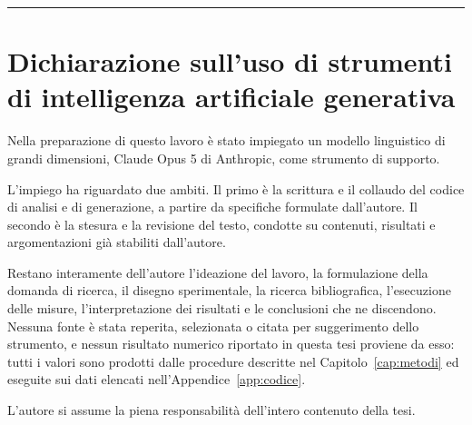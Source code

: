 %

\bigskip
\noindent\rule{\textwidth}{0.4pt}

\section*{Dichiarazione sull'uso di strumenti di intelligenza artificiale
generativa}

Nella preparazione di questo lavoro è stato impiegato un modello linguistico di
grandi dimensioni, Claude Opus 5 di Anthropic, come strumento di supporto.

L'impiego ha riguardato due ambiti. Il primo è la scrittura e il collaudo del
codice di analisi e di generazione, a partire da specifiche formulate
dall'autore. Il secondo è la stesura e la revisione del testo, condotte su
contenuti, risultati e argomentazioni già stabiliti dall'autore.

Restano interamente dell'autore l'ideazione del lavoro, la formulazione della
domanda di ricerca, il disegno sperimentale, la ricerca bibliografica,
l'esecuzione delle misure, l'interpretazione dei risultati e le conclusioni che
ne discendono. Nessuna fonte è stata reperita, selezionata o citata per
suggerimento dello strumento, e nessun risultato numerico riportato in questa
tesi proviene da esso: tutti i valori sono prodotti dalle procedure descritte
nel Capitolo~\ref{cap:metodi} ed eseguite sui dati elencati
nell'Appendice~\ref{app:codice}.

L'autore si assume la piena responsabilità dell'intero contenuto della tesi.
